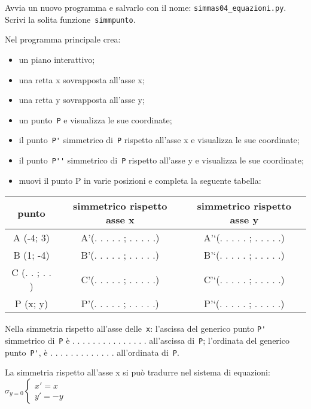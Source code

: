 Avvia un nuovo programma e salvarlo con il nome: 
\lstinline{simmas04_equazioni.py}.
Scrivi la solita funzione~\lstinline{simmpunto}.

Nel programma principale crea:
\begin{itemize} [noitemsep]
\item un piano interattivo;
\item una retta x sovrapposta all'asse x;
\item una retta y sovrapposta all'asse y;
\item un punto~\lstinline{P} e visualizza le sue coordinate;
\item il punto~\lstinline{P'} simmetrico di~\lstinline{P} rispetto all'asse x
e visualizza le sue coordinate;
\item il punto~\lstinline{P''} simmetrico di~\lstinline{P} rispetto all'asse y
e visualizza le sue coordinate;
\item muovi il punto P in varie posizioni e completa la seguente tabella:

\end{itemize}

\begin{center}\begin{tabular}{|c|c|c|}
\hline

punto
 & 
simmetrico rispetto asse x
 & 
simmetrico rispetto asse y
\\
\hline
A (-4; 3)
 & 
A'(. . . . . ; . . . . .)
 & 
A'`(. . . . . ; . . . . .)
\\
\hline
B (1; -4)
 & 
B'(. . . . . ; . . . . .)
 & 
B'`(. . . . . ; . . . . .)
\\
\hline
C (. . ; . . )
 & 
C'(. . . . . ; . . . . .)
 & 
C'`(. . . . . ; . . . . .)
\\
\hline
P (x; y)
 & 
P'(. . . . . ; . . . . .)
 & 
P'`(. . . . . ; . . . . .)
\\
\hline\end{tabular}\end{center}


Nella simmetria rispetto all'asse delle~\lstinline{x}:
l'ascissa del generico punto \lstinline{P'} simmetrico di~\lstinline{P} è . . . 
. . . . . . . . 
. . . .
all'ascissa di~\lstinline{P}; l'ordinata del generico punto~\lstinline{P'}, è . 
. . . 
. . . . . . . . .
all'ordinata di~\lstinline{P}.

La simmetria rispetto all'asse x si può tradurre nel sistema di equazioni:
\(\sigma_{y = 0} \left \{
\begin{array}{l}
x' = x \\
y' = -y
\end{array} \right .\)

